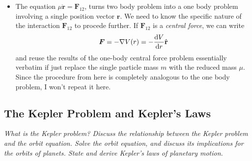 \documentclass[11pt, a4paper]{article}
\newcommand{\uvec}[1]{\hat{\mathbf{#1}}}
\newcommand{\bddot}[1]{\ddot{\bm{#1}}}
\renewcommand{\grad}{\nabla }
\begin{document}
\begin{itemize}
	\item The equation $ \mu \bddot{r} = \bm{F}_{12} $, turns two body problem into a one body problem involving a single position vector $ \bm{r} $. We need to know the specific nature of the interaction $ \bm{F}_{12} $ to procede further. If $ \bm{F}_{12} $ is a \textit{central force}, we can write
	\begin{equation*}
		\bm{F} = - \grad V(r) = - \dv{V}{r}\uvec{r}
	\end{equation*}
	and reuse the results of the one-body central force problem essentially verbatim if just replace the single particle mass $ m $ with the reduced mass $ \mu $. Since the procedure from here is completely analogous to the one body problem, I won't repeat it here.

\end{itemize}



\subsection{The Kepler Problem and Kepler's Laws}
\textit{What is the Kepler problem? Discuss the relationship between the Kepler problem and the orbit equation. Solve the orbit equation, and discuss its implications for the orbits of planets. State and derive Kepler's laws of planetary motion.}
\end{document}
